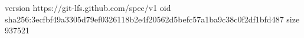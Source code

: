version https://git-lfs.github.com/spec/v1
oid sha256:3ecfbf49a3305d79ef0326118b2e4f20562d5befc57a1ba9c38c0f2df1bfd487
size 937521
